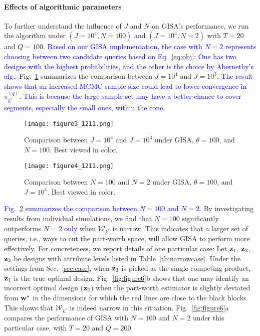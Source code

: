 \documentclass[onecolumn,11pt]{article}
\newcommand{\highlight}[1]{{\textcolor{blue}{{#1}}}}
\newcommand{\highlight}[1]{{{#1}}}
\begin{document}
\paragraph{Effects of algorithmic parameters} To further understand the influence of $J$ and $N$ on GISA's performance, we run the algorithm under $(J=10^4, N=100)$ and $(J=10^3, N=2)$ with $T=20$ and $Q=100$. \highlight{Based on our GISA implementation, the case with $N=2$ represents choosing between two candidate queries based on Eq.~\eqref{eq:obj}: One has two designs with the highest probabilities, and the other is the choice by Abernethy's alg..} Fig.~\ref{fig:figure3} summarizes the comparison between $J=10^4$ and $J=10^3$. \highlight{The result shows that an increased MCMC sample size could lead to lower convergence in $\pi_{k^*}^{(q)}$. This is because the large sample set may have a better chance to cover segments, especially the small ones, within the cone.} 
\begin{figure}
\centering
\texttt{[image: figure3\_1211.png]}
\caption{Comparison between $J=10^4$ and $J=10^3$ under GISA, $\theta=100$, and $N=100$. Best viewed in color.}
\label{fig:figure3}
\end{figure}
\begin{figure}
\centering
\texttt{[image: figure4\_1211.png]}
\caption{Comparison between $N=100$ and $N=2$ under GISA, $\theta=100$, and $J=10^4$. Best viewed in color.}
\label{fig:figure4}
\end{figure}
\highlight{Fig.~\ref{fig:figure4} summarizes the comparison between $N=100$ and $N=2$.} By investigating results from individual simulations, we find that $N=100$ significantly outperforms $N=2$ \highlight{only} when $\mathcal{W}_{k^*}$ is narrow. This indicates that a larger set of queries, i.e., ways to cut the part-worth space, will allow GISA to perform more effectively. For concreteness, we report details of one particular case: Let ${\bf z}_{1}$, ${\bf z}_{2}$, ${\bf z}_{3}$ be designs with attribute levels listed in Table~\ref{tb:narrowcase}. Under the settings from Sec.~\ref{sec:case}, when ${\bf z}_3$ is picked as the single competing product, ${\bf z}_1$ is the true optimal design. Fig.~\ref{fig:figure6}b shows that one may identify an incorrect optimal design (${\bf z}_{2}$) when the part-worth estimator is slightly deviated from ${\bf w}^*$ in the dimensions for which the red lines are close to the black blocks. This shows that $\mathcal{W}_{k^*}$ is indeed narrow in this situation. Fig.~\ref{fig:figure6}a compares the performance of GISA with $N=100$ and $N=2$ under this particular case, with $T=20$ and $Q=200$. 
\end{document}
